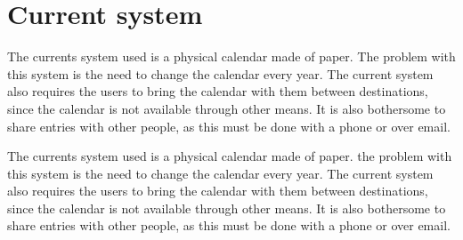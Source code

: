 \section{Current system}
The currents system used is a physical calendar made of paper. The problem with this system is the need to change the calendar every year. The current system also requires the users to bring the calendar with them between destinations, since the calendar is not available through other means. It is also bothersome to share entries with other people, as this must be done with a phone or over email.

The currents system used is a physical calendar made of paper. the problem with this system is the need to change the calendar every year. The current system also requires the users to bring the calendar with them between destinations, since the calendar is not available through other means. It is also bothersome to share entries with other people, as this must be done with a phone or over email.